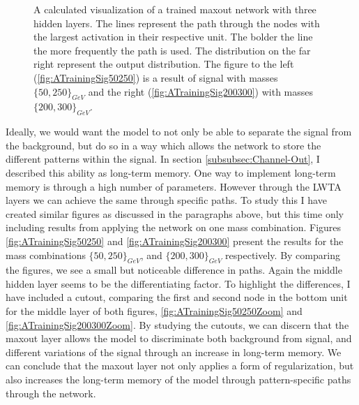 \begin{figure}
{\begin{subfigure}{.6\textwidth}
    \end{subfigure}
    }
    \caption[A calculated visualization of the activation of a three layer maxout network, after training and displaying
    the results for two signal with each their own mass combination.]{A calculated visualization of a trained maxout network 
    with three hidden layers. The lines represent the path through the nodes with the largest activation in their respective
    unit. The bolder the line the more frequently the path is used. The distribution on the far right represent the output 
    distribution. The figure to the left (\ref{fig:ATrainingSig50250}) is a result of signal with masses $\{50,250\}_{GeV}$ 
    and the right (\ref{fig:ATrainingSig200300}) with masses $\{200,300\}_{GeV}$.}
    \label{fig:NetVisSigComp}
\end{figure}
Ideally, we would want the model to not only be able to separate the signal from the background, but do so in 
a way which allows the network to store the different patterns within the signal. In section \ref{subsubsec:Channel-Out},
I described this ability as long-term memory. One way to implement long-term memory is through a high number of parameters.
However through the \ac{LWTA} layers we can achieve the same through specific paths. To study this I have created similar 
figures as discussed in the paragraphs above, but this time only including results from applying the network on one mass combination. 
Figures \ref{fig:ATrainingSig50250} and \ref{fig:ATrainingSig200300} present the results for the mass combinations 
$\{50,250\}_{GeV}$, and $\{200,300\}_{GeV}$ respectively.
By comparing the figures, we see a small but noticeable difference in paths. Again the middle hidden layer seems to be 
the differentiating factor. To highlight the differences, I have included a cutout, comparing the first and second node in the bottom unit 
for the middle layer of both figures, \ref{fig:ATrainingSig50250Zoom} and \ref{fig:ATrainingSig200300Zoom}.
By studying the cutouts, we can discern that the maxout layer allows the model to discriminate both background from signal, 
and different variations of the signal through an increase in long-term memory. We can conclude that the maxout layer not only 
applies a form of regularization, but also increases the long-term memory of the model through pattern-specific paths through the network.\\
